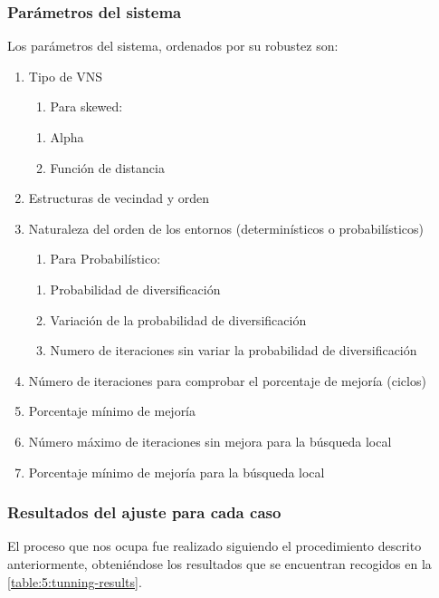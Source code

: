 \subsubsection{Parámetros del sistema} \label{sec:5:parametros-sistema}
Los parámetros del sistema, ordenados por su robustez son:
\begin{enumerate}
	\item Tipo de VNS
	\begin{enumerate}[label={},left=-1pt]
		\item Para skewed:
	\end{enumerate}
	\begin{enumerate}[label*={\arabic*}]
		\item Alpha
		\item Función de distancia 
	\end{enumerate}
	\item Estructuras de vecindad y orden
	\item Naturaleza del orden de los entornos (determinísticos o probabilísticos)
	\begin{enumerate}[label={},left=-1pt]
		\item Para Probabilístico:
	\end{enumerate}
	\begin{enumerate}[label*={\arabic*}]
		\item Probabilidad de diversificación
		\item Variación de la probabilidad de diversificación 
		\item Numero de iteraciones sin variar la probabilidad de diversificación 
	\end{enumerate}
	\item Número de iteraciones para comprobar el porcentaje de mejoría (ciclos)
	\item Porcentaje mínimo de mejoría
	\item Número máximo de iteraciones sin mejora para la búsqueda local
	\item Porcentaje mínimo de mejoría para la búsqueda local
\end{enumerate}

\subsubsection{Resultados del ajuste para cada caso}

El proceso que nos ocupa fue realizado siguiendo el procedimiento descrito anteriormente, obteniéndose los resultados que se encuentran recogidos en la \autoref{table:5:tunning-results}.

